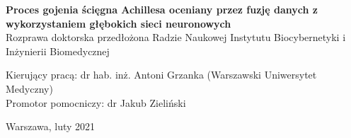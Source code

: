 \begin{onehalfspacing}
\begin{center}
{\large{
\textbf
{Proces gojenia ścięgna Achillesa oceniany przez fuzję danych z wykorzystaniem głębokich sieci neuronowych}} \\[2.3cm]
\large
{Rozprawa doktorska przedłożona Radzie Naukowej Instytutu Biocybernetyki i Inżynierii Biomedycznej \\[1.3cm]}



\normalsize{
\begin{flushleft}
Kierujący pracą:  dr hab. inż. Antoni Grzanka (Warszawski Uniwersytet Medyczny) \\
Promotor pomocniczy:  dr Jakub Zieliński \\
\end{flushleft} 

\vspace{1cm}
Warszawa, luty 2021}}
\end{center}
\end{onehalfspacing}





\setcounter{page}{0} \pagestyle{plain}

\tableofcontents



\pagestyle{fancy}